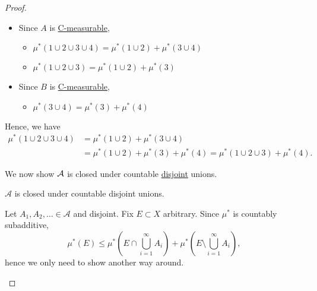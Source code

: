 \begin{proof}
\begin{enumerate}[(1)]
\begin{itemize}
\begin{explanation}
				            \begin{itemize}
					            \item Since \(A\) is \hyperref[def:C-measurable]{C-measurable},
					                  \begin{itemize}
						                  \item \(\mu^{\ast} (1\cup 2\cup 3\cup 4) = \mu^{\ast} (1\cup 2) + \mu^{\ast} (3\cup 4)\)
						                  \item \(\mu^{\ast} (1\cup 2\cup 3) = \mu^{\ast} (1\cup 2) + \mu^{\ast} (3)\)
					                  \end{itemize}
					            \item Since \(B\) is \hyperref[def:C-measurable]{C-measurable},
					                  \begin{itemize}
						                  \item \(\mu^{\ast} (3\cup 4) = \mu^{\ast} (3) + \mu^{\ast} (4)\)
					                  \end{itemize}
				            \end{itemize}
				            Hence, we have
				            \[
					            \begin{split}
						            \mu^{\ast} (1\cup 2\cup 3\cup 4) &= \mu^{\ast} (1\cup 2)+\mu^{\ast} (3\cup 4)\\
						            &= \mu^{\ast} (1\cup 2) + \mu^{\ast} (3) + \mu^{\ast} (4)
						            = \mu^{\ast}(1\cup 2\cup 3) + \mu^{\ast} (4).
					            \end{split}
				            \]
			            \end{explanation}
			            We now show \(\mathcal{\MakeUppercase{a}} \) is closed under countable \underline{disjoint} unions.
			            \begin{claim}
				            \(\mathcal{A} \) is closed under countable disjoint unions.
			            \end{claim}
			            \begin{explanation}
				            Let \(A_1, A_2, \ldots \in\mathcal{A}\) and disjoint.
				            Fix \(E\subset X\) arbitrary. Since \(\mu^{\ast} \) is countably subadditive,
				            \[
					            \mu^{\ast} (E) \leq  \mu^{\ast} \left(E\cap \bigcup\limits_{i=1}^{\infty} A_{i}\right) + \mu^{\ast} \left(E\setminus \bigcup\limits_{i=1}^{\infty} A_{i}\right),
				            \]
				            hence we only need to show another way around.


\end{explanation}
\end{itemize}
\end{enumerate}
\end{proof}
